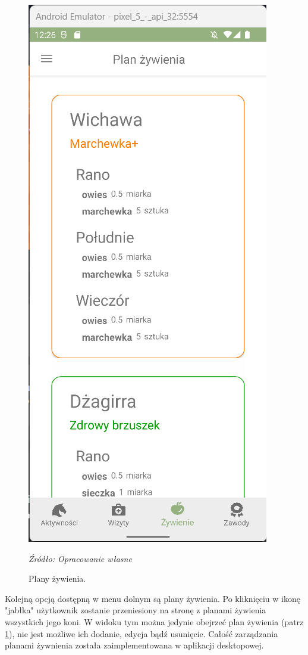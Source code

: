 \documentclass[12pt,oneside]{report}
\begin{document}
\newpage
\begin{figure}
	\centering
	\includegraphics[scale=0.7]{NutritionPlan}
	\caption{\centering Plany żywienia.}
	\textit{Źródło: Opracowanie własne}
	\label{NutritionPlan}
\end{figure}
Kolejną opcją dostępną w menu dolnym są plany żywienia. Po kliknięciu w ikonę "jabłka" użytkownik zostanie przeniesiony na stronę z planami żywienia wszystkich jego koni. W widoku tym można jedynie obejrzeć plan żywienia (patrz \ref{NutritionPlan}), nie jest możliwe ich dodanie, edycja bądź usunięcie. Całość zarządzania planami żywnienia została zaimplementowana w aplikacji desktopowej.
\end{document}
